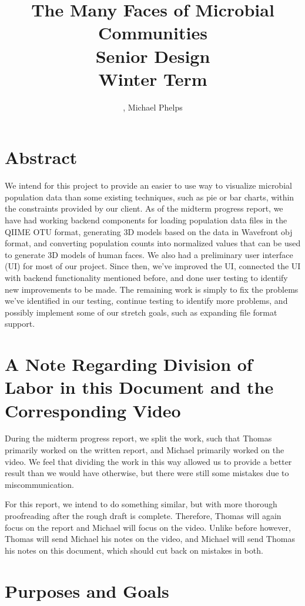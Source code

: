\documentclass[letterpaper,10pt, onecolumn, draftclsnofoot]{IEEEtran}
\title{The Many Faces of Microbial Communities \\\large Senior Design\\Winter Term\\}
\author{\name, Michael Phelps}
\begin{document}
\maketitle
\section*{Abstract}
We intend for this project to provide an easier to use way to visualize microbial population data than some existing techniques, such as pie or bar charts, within the constraints provided by our client. As of the midterm progress report, we have had working backend components for loading population data files in the QIIME OTU format, generating 3D models based on the data in Wavefront obj format, and converting population counts into normalized values that can be used to generate 3D models of human faces. We also had a preliminary user interface (UI) for most of our project. Since then, we've improved the UI, connected the UI with backend functionality mentioned before, and done user testing to identify new improvements to be made. The remaining work is simply to fix the problems we've identified in our testing, continue testing to identify more problems, and possibly implement some of our stretch goals, such as expanding file format support.

\clearpage

\tableofcontents

\section{A Note Regarding Division of Labor in this Document and the Corresponding Video}
During the midterm progress report, we split the work, such that Thomas primarily worked on the written report, and Michael primarily worked on the video. We feel that dividing the work in this way allowed us to provide a better result than we would have otherwise, but there were still some mistakes due to miscommunication.

For this report, we intend to do something similar, but with more thorough proofreading after the rough draft is complete. Therefore, Thomas will again focus on the report and Michael will focus on the video. Unlike before however, Thomas will send Michael his notes on the video, and Michael will send Thomas his notes on this document, which should cut back on mistakes in both.

\section{Purposes and Goals}
\end{document}
